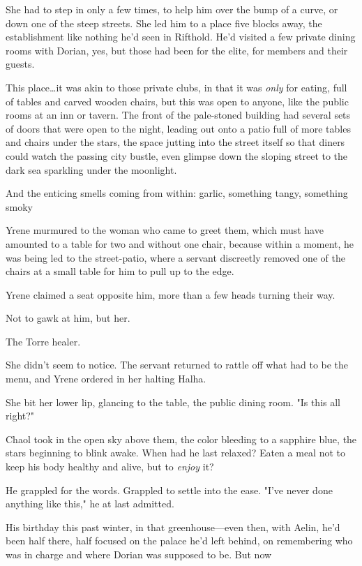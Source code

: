 She had to step in only a few times, to help him over the bump of a curve, or down one of the steep streets.
She led him to a place five blocks away, the establishment like nothing he'd seen in Rifthold.
He'd visited a few private dining rooms with Dorian, yes, but those had been for the elite, for members and their guests.

This place\ldots it was akin to those private clubs, in that it was \emph{only} for eating, full of tables and carved wooden chairs, but this was open to anyone, like the public rooms at an inn or tavern.
The front of the pale-stoned building had several sets of doors that were open to the night, leading out onto a patio full of more tables and chairs under the stars, the space jutting into the street itself so that diners could watch the passing city bustle, even glimpse down the sloping street to the dark sea sparkling under the moonlight.

And the enticing smells coming from within: garlic, something tangy, something smoky 

Yrene murmured to the woman who came to greet them, which must have amounted to a table for two and without one chair, because within a moment, he was being led to the street-patio, where a servant discreetly removed one of the chairs at a small table for him to pull up to the edge.

Yrene claimed a seat opposite him, more than a few heads turning their way.

Not to gawk at him, but her.

The Torre healer.

She didn't seem to notice.
The servant returned to rattle off what had to be the menu, and Yrene ordered in her halting Halha.

She bit her lower lip, glancing to the table, the public dining room.
"Is this all right?"

Chaol took in the open sky above them, the color bleeding to a sapphire blue, the stars beginning to blink awake.
When had he last relaxed?
Eaten a meal not to keep his body healthy and alive, but to \emph{enjoy}
it?

He grappled for the words.
Grappled to settle into the ease.
"I've never done anything like this," he at last admitted.

His birthday this past winter, in that greenhouse---even then, with Aelin, he'd been half there, half focused on the palace he'd left behind, on remembering who was in charge and where Dorian was supposed to be.
But now 

